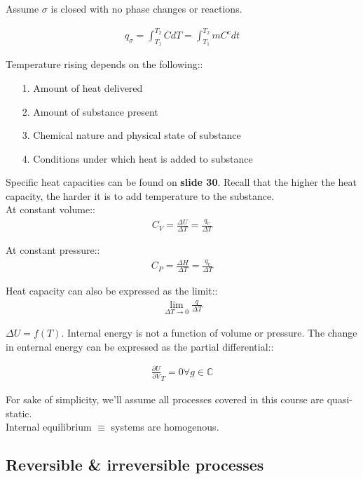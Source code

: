 \documentclass[12pt]{article}
\begin{document}
Assume $\sigma$ is closed with no phase changes or reactions.

\begin{align*}
    q_\sigma=\int_{T_1}^{T_2}CdT=\int_{T_1}^{T_2}mC^c dt
\end{align*}

Temperature rising depends on the following::
\begin{itemize}
    \item[1.] Amount of heat delivered
    \item[2.] Amount of substance present
    \item[3.] Chemical nature and physical state of substance
    \item[4.] Conditions under which heat is added to substance
\end{itemize}
Specific heat capacities can be found on \textbf{slide 30}. Recall that the higher the heat capacity, the harder it is to add temperature to the substance.\\

At constant volume::
\begin{align*}
    C_V=\frac{\Delta U}{\Delta T}=\frac{q_v}{\Delta T}
\end{align*}

At constant pressure::
\begin{align*}
    C_P=\frac{\Delta H}{\Delta T}=\frac{q_v}{\Delta T}
\end{align*}

Heat capacity can also be expressed as the limit::
\begin{align*}
    \lim_{\Delta T \rightarrow 0}\frac{q}{\Delta T}
\end{align*}

$\Delta U=f(T)$. Internal energy is not a function of volume or pressure. The change in enternal energy can be expressed as the partial differential::

\begin{align*}
    \frac{\partial U}{\partial V}_T=0 \forall g\in\mathbb{C} 
\end{align*}

For sake of simplicity, we'll assume all processes covered in this course are quasi-static.\\

Internal equilibrium $\equiv$ systems are homogenous.

\subsection*{Reversible \& irreversible processes}
\end{document}
